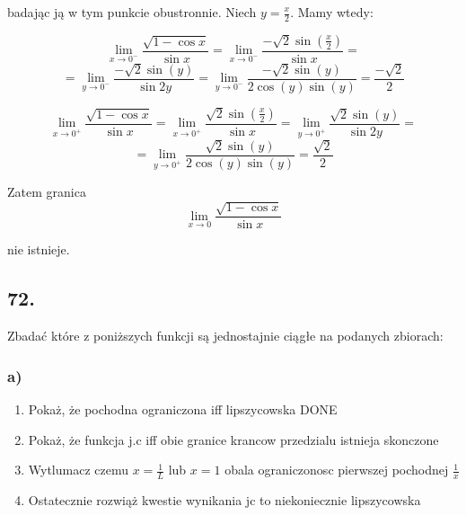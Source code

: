 \documentclass{article}
\begin{document}
badając ją w tym punkcie obustronnie. Niech \(y = \frac{x}{2}\). Mamy wtedy:

\begin{equation*}
    \lim_{x \to 0^{-}} \frac{\sqrt{1 - \cos x}}{\sin x} = \lim_{x \to 0^{-}} \frac{- \sqrt{2}  \sin (\frac{x}{2})}{\sin x} = 
\end{equation*}
\begin{equation*}
    = \lim_{y \to 0^{-}} \frac{-\sqrt{2} \sin (y)}{\sin 2y} = \lim_{y \to 0^{-}} \frac{- \sqrt{2} \sin (y)}{2 \cos(y) \sin(y)} = \frac{- \sqrt{2}}{2}
\end{equation*}

\begin{equation*}
    \lim_{x \to 0^{+}} \frac{\sqrt{1 - \cos x}}{\sin x} = \lim_{x \to 0^{+}} \frac{ \sqrt{2}  \sin (\frac{x}{2})}{\sin x} = \lim_{y \to 0^{+}} \frac{\sqrt{2} \sin (y)}{\sin 2y} =
\end{equation*}
\begin{equation*}
    = \lim_{y \to 0^{+}} \frac{\sqrt{2} \sin (y)}{2 \cos(y) \sin(y)} = \frac{\sqrt{2}}{2}
\end{equation*}

Zatem granica
\begin{equation*}
    \lim_{x \to 0} \frac{\sqrt{1 - \cos x}}{\sin x}
\end{equation*}

nie istnieje.

\subsection*{72.}

Zbadać które z poniższych funkcji są jednostajnie ciągłe na podanych zbiorach:

\subsubsection*{a)}

\begin{enumerate}
    \item Pokaż, że pochodna ograniczona iff lipszycowska DONE
    \item Pokaż, że funkcja j.c iff obie granice krancow przedzialu istnieja skonczone
    \item Wytlumacz czemu \(x = \frac{1}{L}\) lub \(x = 1\) obala ograniczonosc pierwszej pochodnej \(\frac{1}{x}\)
    \item Ostatecznie rozwiąż kwestie wynikania jc to niekoniecznie lipszycowska 
\end{enumerate}
\end{document}

